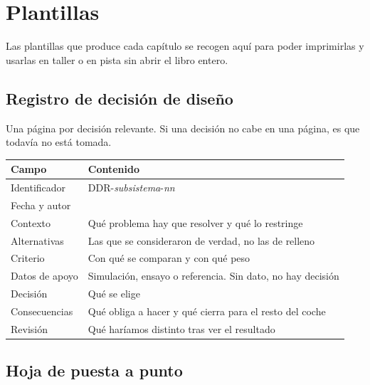 \chapter{Plantillas}
\label{ch:plantillas}

Las plantillas que produce cada capítulo se recogen aquí para poder imprimirlas
y usarlas en taller o en pista sin abrir el libro entero.

\section{Registro de decisión de diseño}
\label{sec:plantilla_ddr}

Una página por decisión relevante. Si una decisión no cabe en una página, es que
todavía no está tomada.

\begin{center}
\begin{tabular}{@{}p{4cm}p{9.5cm}@{}}
\toprule
\textbf{Campo} & \textbf{Contenido} \\
\midrule
Identificador      & DDR-\textit{subsistema}-\textit{nn} \\
Fecha y autor      & \\
Contexto           & Qué problema hay que resolver y qué lo restringe \\
Alternativas       & Las que se consideraron de verdad, no las de relleno \\
Criterio           & Con qué se comparan y con qué peso \\
Datos de apoyo     & Simulación, ensayo o referencia. Sin dato, no hay decisión \\
Decisión           & Qué se elige \\
Consecuencias      & Qué obliga a hacer y qué cierra para el resto del coche \\
Revisión           & Qué haríamos distinto tras ver el resultado \\
\bottomrule
\end{tabular}
\end{center}

\section{Hoja de puesta a punto}
\label{sec:plantilla_setup}

